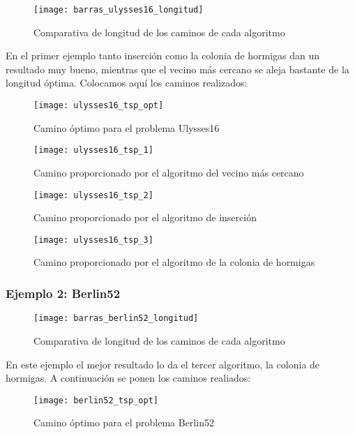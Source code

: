 \begin{figure}[h]	\texttt{[image: barras\_ulysses16\_longitud]} \centering
	\caption{Comparativa de longitud de los caminos de cada algoritmo} \end{figure}


En el primer ejemplo tanto inserción como la colonia de hormigas dan un resultado muy bueno, mientras que el vecino más cercano se aleja bastante de la longitud óptima. Colocamos aquí los caminos realizados:

\begin{figure}[h]	\texttt{[image: ulysses16\_tsp\_opt]} \centering
	\caption{Camino óptimo para el problema Ulysses16} \end{figure}

\begin{figure}[h]	\texttt{[image: ulysses16\_tsp\_1]} \centering
	\caption{Camino proporcionado por el algoritmo del vecino más cercano} \end{figure}

\begin{figure}[h]	\texttt{[image: ulysses16\_tsp\_2]} \centering
	\caption{Camino proporcionado por el algoritmo de inserción} \end{figure}

\begin{figure}[h]	\texttt{[image: ulysses16\_tsp\_3]} \centering
	\caption{Camino proporcionado por el algoritmo de la colonia de hormigas} \end{figure}

\clearpage
\subsubsection{Ejemplo 2: Berlin52}


\begin{figure}[h]	\texttt{[image: barras\_berlin52\_longitud]} \centering
	\caption{Comparativa de longitud de los caminos de cada algoritmo} \end{figure}


En este ejemplo el mejor resultado lo da el tercer algoritmo, la colonia de hormigas. A continuación se ponen los caminos realiados:

\begin{figure}[h]   \texttt{[image: berlin52\_tsp\_opt]} \centering
	\caption{Camino óptimo para el problema Berlin52} \end{figure}

